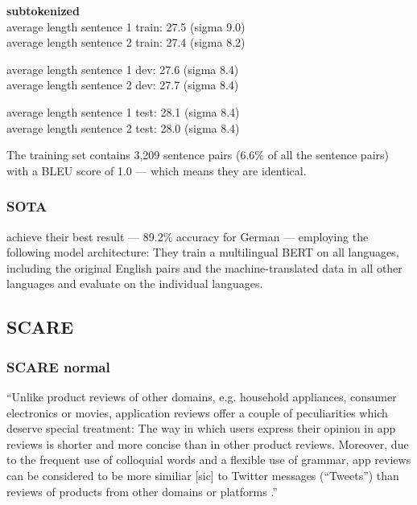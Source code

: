 \textbf{subtokenized} \\
average length sentence 1 train: 27.5 (sigma 9.0) \\
average length sentence 2 train: 27.4 (sigma 8.2)

average length sentence 1 dev: 27.6 (sigma 8.4) \\
average length sentence 2 dev: 27.7 (sigma 8.4)

average length sentence 1 test: 28.1 (sigma 8.4) \\
average length sentence 2 test: 28.0 (sigma 8.4)


The training set contains 3,209 sentence pairs (6.6\% of all the sentence pairs) with a BLEU score of 1.0 --- which means they are identical.


\subsubsection{SOTA}

\cite{yang2019paws} achieve their best result --- 89.2\% accuracy for German --- employing the following model architecture:
They train a multilingual BERT on all languages, including the original English pairs and the machine-translated data in all other languages and evaluate on the individual languages.

\subsection{SCARE}

\subsubsection{SCARE normal}

``Unlike product reviews of other domains, e.g. household appliances, consumer electronics or movies, application reviews offer a couple of peculiarities which deserve special treatment:
The way in which users express their opinion in app reviews is shorter and more concise than in other product reviews.
Moreover, due to the frequent use of colloquial words and a flexible use of grammar, app reviews can be considered to be more similiar [sic] to Twitter messages (“Tweets”) than reviews of products from other domains or platforms \textelp{}.'' \citep[p.~1114]{sanger2016scare}


